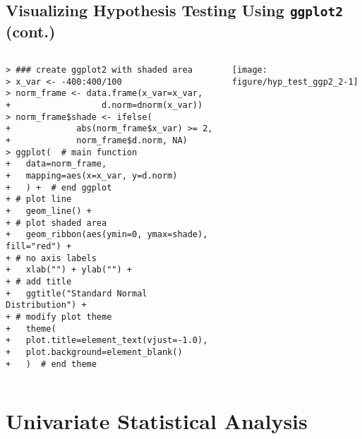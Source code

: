 \documentclass[10pt]{beamer}\usepackage[]{graphicx}\usepackage[]{color}
\makeatletter
\newenvironment{kframe}{%
 \def\at@end@of@kframe{}%
 \ifinner\ifhmode%
  \def\at@end@of@kframe{\end{minipage}}%
  \begin{minipage}{\columnwidth}%
 \fi\fi%
 \def\FrameCommand##1{\hskip\@totalleftmargin \hskip-\fboxsep
 \colorbox{shadecolor}{##1}\hskip-\fboxsep
     \hskip-\linewidth \hskip-\@totalleftmargin \hskip\columnwidth}%
 \MakeFramed {\advance\hsize-\width
   \@totalleftmargin\z@ \linewidth\hsize
   \@setminipage}}%
 {\par\unskip\endMakeFramed%
 \at@end@of@kframe}
\newenvironment{knitrout}{}{} %
\makeatother
\begin{document}
\subsection{Visualizing Hypothesis Testing Using \texttt{ggplot2} (cont.)}
\begin{frame}[fragile,t]{\subsecname}
\vspace{-1em}
\begin{block}{}
  \begin{columns}[T]
\begin{knitrout}\scriptsize
{}\color{fgcolor}\begin{kframe}
\begin{verbatim}
> ### create ggplot2 with shaded area
> x_var <- -400:400/100
> norm_frame <- data.frame(x_var=x_var,
+                  d.norm=dnorm(x_var))
> norm_frame$shade <- ifelse(
+             abs(norm_frame$x_var) >= 2,
+             norm_frame$d.norm, NA)
> ggplot(  # main function
+   data=norm_frame,
+   mapping=aes(x=x_var, y=d.norm)
+   ) +  # end ggplot
+ # plot line
+   geom_line() +
+ # plot shaded area
+   geom_ribbon(aes(ymin=0, ymax=shade), fill="red") +
+ # no axis labels
+   xlab("") + ylab("") +
+ # add title
+   ggtitle("Standard Normal Distribution") +
+ # modify plot theme
+   theme(
+   plot.title=element_text(vjust=-1.0),
+   plot.background=element_blank()
+   )  # end theme
\end{verbatim}
\end{kframe}
\end{knitrout}
      \hspace*{-1em}
      \texttt{[image: figure/hyp\_test\_ggp2\_2-1]}
  \end{columns}
\end{block}

\end{frame}


\section{Univariate Statistical Analysis}


\end{document}
